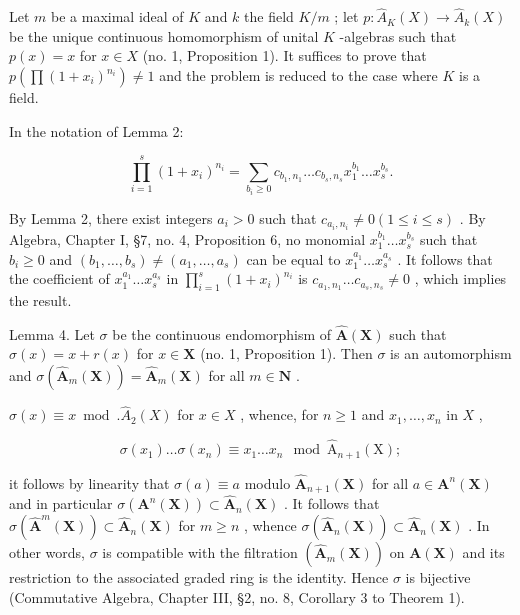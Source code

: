 Let \(m\) be a maximal ideal of \(K\) and \(k\) the field \(K/m\) ; let \(p: \hat{A}_K(X) \to \hat{A}_k(X)\) be the unique continuous homomorphism of unital \(K\) -algebras such that \(p(x) = x\) for \(x \in X\) (no. 1, Proposition 1). It suffices to prove that \(p\left(\prod (1 + x_i)^{n_i}\right) \neq 1\) and the problem is reduced to the case where \(K\) is a field.

In the notation of Lemma 2:

\[
\prod_ {i = 1} ^ {s} (1 + x _ {i}) ^ {n _ {i}} = \sum_ {b _ {i} \geqslant 0} c _ {b _ {1}, n _ {1}} \dots c _ {b _ {s}, n _ {s}} x _ {1} ^ {b _ {1}} \dots x _ {s} ^ {b _ {s}}.
\]

By Lemma 2, there exist integers \(a_i > 0\) such that \(c_{a_i, n_i} \neq 0 (1 \leqslant i \leqslant s)\) . By Algebra, Chapter I, §7, no. 4, Proposition 6, no monomial \(x_1^{b_1} \ldots x_s^{b_s}\) such that \(b_{i} \geqslant 0\) and \((b_{1}, \ldots, b_{s}) \neq (a_{1}, \ldots, a_{s})\) can be equal to \(x_{1}^{a_{1}} \ldots x_{s}^{a_{s}}\) . It follows that the coefficient of \(x_{1}^{a_{1}} \ldots x_{s}^{a_{s}}\) in \(\prod_{i=1}^{s} (1 + x_{i})^{n_{i}}\) is \(c_{a_{1}, n_{1}} \ldots c_{a_{s}, n_{s}} \neq 0\) , which implies the result.

Lemma 4. Let \(\sigma\) be the continuous endomorphism of \(\hat{\mathbf{A}}(\mathbf{X})\) such that \(\sigma(x) = x + r(x)\) for \(x \in \mathbf{X}\) (no. 1, Proposition 1). Then \(\sigma\) is an automorphism and \(\sigma(\hat{\mathbf{A}}_m(\mathbf{X})) = \hat{\mathbf{A}}_m(\mathbf{X})\) for all \(m \in \mathbf{N}\) .

\(\sigma(x) \equiv x \bmod. \hat{A}_2(X)\) for \(x \in X\) , whence, for \(n \geqslant 1\) and \(x_1, \ldots, x_n\) in \(X\) ,

\[
\sigma (x _ {1}) \dots \sigma (x _ {n}) \equiv x _ {1} \dots x _ {n} \mod \hat {\mathrm{A}} _ {n + 1} (\mathrm{X});
\]

it follows by linearity that \(\sigma(a) \equiv a\) modulo \(\hat{\mathbf{A}}_{n+1}(\mathbf{X})\) for all \(a \in \mathbf{A}^n(\mathbf{X})\) and in particular \(\sigma(\mathbf{A}^n(\mathbf{X})) \subset \hat{\mathbf{A}}_n(\mathbf{X})\) . It follows that \(\sigma(\hat{\mathbf{A}}^m(\mathbf{X})) \subset \hat{\mathbf{A}}_n(\mathbf{X})\) for \(m \geqslant n\) , whence \(\sigma(\hat{\mathbf{A}}_n(\mathbf{X})) \subset \hat{\mathbf{A}}_n(\mathbf{X})\) . In other words, \(\sigma\) is compatible with the filtration \((\hat{\mathbf{A}}_m(\mathbf{X}))\) on \(\mathbf{A}(\mathbf{X})\) and its restriction to the associated graded ring is the identity. Hence \(\sigma\) is bijective (Commutative Algebra, Chapter III, §2, no. 8, Corollary 3 to Theorem 1).

